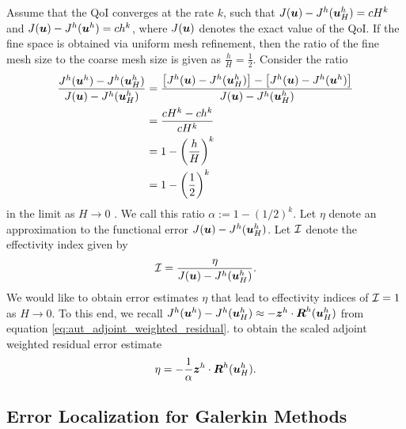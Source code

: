 Assume that the QoI converges at the rate $k$, such that
$J(\boldsymbol{u}) - J^h(\boldsymbol{u}^h_H) = c H^k$ and $J(\boldsymbol{u}) - J^h(\boldsymbol{u}^h) = ch^k$,
where $J(\boldsymbol{u})$ denotes the exact value of the QoI. If the fine space
is obtained via uniform mesh refinement, then the ratio of the fine mesh size
to the coarse mesh size is given as $\frac{h}{H} = \frac12$. Consider the ratio
%
\begin{gather}
\begin{aligned}
\frac{ J^h (\boldsymbol{u}^h) - J^h(\boldsymbol{u}^h_H) }{ J(\boldsymbol{u}) - J^h(\boldsymbol{u}^h_H) }
&= \frac{\left[ J^h(\boldsymbol{u}) - J^h(\boldsymbol{u}^h_H) \right] -
\left[ J^h(\boldsymbol{u}) - J^h(\boldsymbol{u}^h) \right] }
{ J(\boldsymbol{u}) - J^h(\boldsymbol{u}^h_H) } \\
&= \frac{c H^k - ch^k}{c H^k} \\
&= 1 - \left( \frac{h}{H} \right)^k \\
&= 1 - \left( \frac12 \right)^k
\end{aligned}
\end{gather}
%
in the limit as $H \to 0$ \cite{fidkowski2011review}. We call this
ratio $\alpha := 1 - (1/2)^k$. Let $\eta$ denote an approximation
to the functional error $J(\boldsymbol{u}) - J^h(\boldsymbol{u}^h_H)$. Let $\mathcal{I}$
denote the effectivity index given by
%
\begin{gather}
\mathcal{I} = \frac{\eta}{ J(\boldsymbol{u}) - J^h(\boldsymbol{u}^h_H) }.
\label{eq:aut_effectivity}
\end{gather}
%
We would like to obtain error estimates $\eta$ that lead to
effectivity indices of $\mathcal{I} = 1$ as $H \to 0$. To this end, we recall
$J^h(\boldsymbol{u}^h) - J^h(\boldsymbol{u}^h_H) \approx - \boldsymbol{z}^h \cdot
\boldsymbol{R}^h(\boldsymbol{u}^h_H)$ from equation \eqref{eq:aut_adjoint_weighted_residual}.
to obtain the scaled adjoint weighted residual error estimate
%
\begin{gather}
\eta = - \frac{1}{\alpha} \boldsymbol{z}^h \cdot \boldsymbol{R}^h(\boldsymbol{u}^h_H).
\label{eq:aut_error_estimate}
\end{gather}

\subsection{Error Localization for Galerkin Methods}

